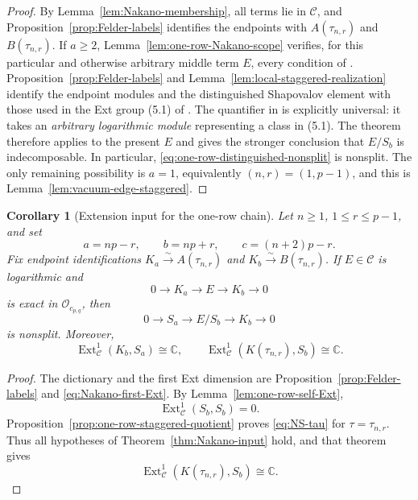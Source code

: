 \documentclass[12pt,leqno]{amsart}
\numberwithin{equation}{section}
\newtheorem{cor}[thm]{Corollary}
\newcommand{\Ext}{\operatorname{Ext}}
\newcommand{\Oc}{\mathcal O}
\def\C{\mathbb{C}}
\begin{document}
\begin{proof}
By Lemma~\ref{lem:Nakano-membership}, all terms lie in $\mathscr C$, and
Proposition~\ref{prop:Felder-labels} identifies the endpoints with
$A(\tau_{n,r})$ and $B(\tau_{n,r})$.  If $a\ge2$, Lemma~\ref{lem:one-row-Nakano-scope} verifies, for this
particular and otherwise arbitrary middle term $E$, every condition of
\cite[Definitions~3.14 and~5.1]{Nakano}.  Proposition~\ref{prop:Felder-labels}
and Lemma~\ref{lem:local-staggered-realization} identify the endpoint
modules and the distinguished Shapovalov element with those used in the
Ext group (5.1) of \cite{Nakano}.  The quantifier in
\cite[Theorem~5.11]{Nakano} is explicitly universal: it takes an
\emph{arbitrary logarithmic module} representing a class in (5.1).  The
theorem therefore applies to the present $E$ and gives the stronger
conclusion that $E/S_b$ is indecomposable.  In particular,
\eqref{eq:one-row-distinguished-nonsplit} is nonsplit.  The only remaining
possibility is $a=1$, equivalently $(n,r)=(1,p-1)$, and this is
Lemma~\ref{lem:vacuum-edge-staggered}.
\end{proof}

\begin{cor}[Extension input for the one-row chain]\label{cor:Nakano-one-row}
Let $n\ge1$, $1\le r\le p-1$, and set
\[
 a=np-r,\qquad b=np+r,\qquad c=(n+2)p-r.
\]
Fix endpoint identifications
$K_a\xrightarrow{\sim}A(\tau_{n,r})$ and
$K_b\xrightarrow{\sim}B(\tau_{n,r})$.  If $E\in\mathscr C$ is
logarithmic and
\[
 0\longrightarrow K_a\longrightarrow E\longrightarrow K_b
 \longrightarrow0
\]
is exact in $\Oc_{c_{p,q}}$, then
\[
 0\longrightarrow S_a\longrightarrow E/S_b\longrightarrow K_b
 \longrightarrow0
\]
is nonsplit.  Moreover,
\[
 \Ext^1_{\mathscr C}(K_b,S_a)\cong\C,
 \qquad
 \Ext^1_{\mathscr C}(K(\tau_{n,r}),S_b)\cong\C.
\]
\end{cor}

\begin{proof}
The dictionary and the first Ext dimension are
Proposition~\ref{prop:Felder-labels} and
\eqref{eq:Nakano-first-Ext}.  By
Lemma~\ref{lem:one-row-self-Ext},
\[
 \Ext^1_{\mathscr C}(S_b,S_b)=0.
\]
Proposition~\ref{prop:one-row-staggered-quotient} proves
\eqref{eq:NS-tau} for $\tau=\tau_{n,r}$.  Thus all hypotheses of
Theorem~\ref{thm:Nakano-input} hold, and that theorem gives
\[
 \Ext^1_{\mathscr C}(K(\tau_{n,r}),S_b)\cong\C.
\]
\end{proof}
\end{document}
